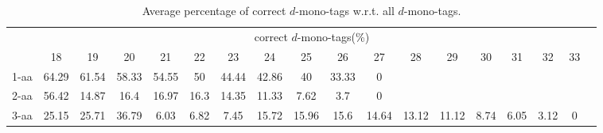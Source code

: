\begin{table}[h]\tiny
\vspace{3mm}
{\centering
\begin{center}
\begin{tabular}{|l|c|c|c|c|c|c|c|c|c|c|c|c|c|c|c|c|c|}
  \hline
  & \multicolumn{ 16 }{|c|}{correct $d$-mono-tags(\%)} \\
  \cline{2- 17}
    & 18 & 19 & 20 & 21 & 22 & 23 & 24 & 25 & 26 & 27 & 28 & 29 & 30 & 31 & 32 & 33\\
  \hline
1-aa  & 64.29 & 61.54 & 58.33 & 54.55 & 50 & 44.44 & 42.86 & 40 & 33.33 & 0 &  &  &  &  &  & \\
2-aa  & 56.42 & 14.87 & 16.4 & 16.97 & 16.3 & 14.35 & 11.33 & 7.62 & 3.7 & 0 &  &  &  &  &  & \\
3-aa  & 25.15 & 25.71 & 36.79 & 6.03 & 6.82 & 7.45 & 15.72 & 15.96 & 15.6 & 14.64 & 13.12 & 11.12 & 8.74 & 6.05 & 3.12 & 0\\
 \hline
\end{tabular}
\end{center}
\par}
\centering
\caption{ Average percentage of correct $d$-mono-tags w.r.t. all $d$-mono-tags.}
\vspace{3mm}
\label{table:correct-d-mono-tags}
\end{table}
